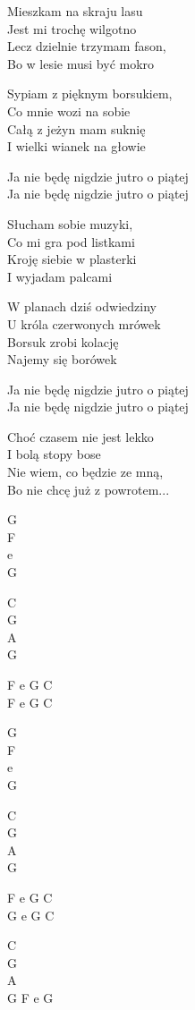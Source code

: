 \begin{text}
    Mieszkam na skraju lasu\\
    Jest mi trochę wilgotno\\
    Lecz dzielnie trzymam fason,\\
    Bo w lesie musi być mokro

    Sypiam z pięknym borsukiem,\\
    Co mnie wozi na sobie\\
    Całą z jeżyn mam suknię\\
    I wielki wianek na głowie

    Ja nie będę nigdzie jutro o piątej\\
    Ja nie będę nigdzie jutro o piątej

    Słucham sobie muzyki,\\
    Co mi gra pod listkami\\
    Kroję siebie w plasterki\\
    I wyjadam palcami

    W planach dziś odwiedziny\\
    U króla czerwonych mrówek\\
    Borsuk zrobi kolację\\
    Najemy się borówek

    Ja nie będę nigdzie jutro o piątej\\
    Ja nie będę nigdzie jutro o piątej

    Choć czasem nie jest lekko\\
    I bolą stopy bose\\
    Nie wiem, co będzie ze mną,\\
    Bo nie chcę już z powrotem...
\end{text}
\begin{chord}
    G\\
    F\\
    e\\
    G

    C\\
    G\\
    A\\
    G

    F e G C\\
    F e G C

    G\\
    F\\
    e\\
    G

    C\\
    G\\
    A\\
    G

    F e G C\\
    G e G C

    C\\
    G\\
    A\\
    G F e G
\end{chord}
